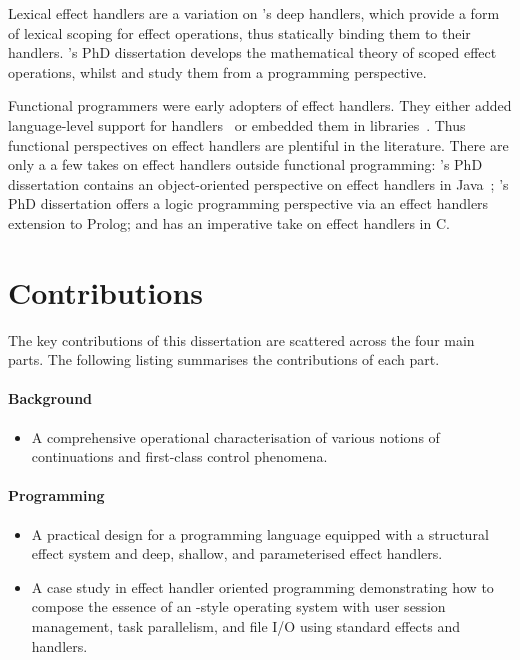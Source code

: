 \documentclass[12pt,phd,lfcs,twoside,openright,logo,leftchapter,normalheadings]{infthesis}
\theoremstyle{plain}
\theoremstyle{definition}
\begin{document}
Lexical effect handlers are a variation on \citeauthor{PlotkinP09}'s
deep handlers, which provide a form of lexical scoping for effect
operations, thus statically binding them to their handlers.
%
\citeauthor{Geron19}'s PhD dissertation develops the mathematical
theory of scoped effect operations, whilst \citet{WuSH14} and
\citet{BiernackiPPS20} study them from a programming perspective.

Functional programmers were early adopters of effect handlers. They
either added language-level support for handlers~
\cite{Hillerstrom15,DolanWSYM15,BiernackiPPS18,Leijen17,BauerP15,BrachthauserSO20a,LindleyMM17,Chiusano20}
or embedded them in
libraries~\cite{KiselyovSS13,KiselyovI15,KiselyovS16,KammarLO13,BrachthauserS17,Brady13,XieL20}. Thus
functional perspectives on effect handlers are plentiful in the
literature. There are only a a few takes on effect handlers outside
functional programming: \citeauthor{Brachthauser20}'s PhD dissertation
contains an object-oriented perspective on effect handlers in
Java~\cite{Brachthauser20}; \citeauthor{Saleh19}'s PhD dissertation
offers a logic programming perspective via an effect handlers
extension to Prolog; and \citet{Leijen17b} has an imperative take on
effect handlers in C.

\section{Contributions}
The key contributions of this dissertation are scattered across the
four main parts. The following listing summarises the contributions of
each part.
\paragraph{Background}
\begin{itemize}
  \item A comprehensive operational characterisation of various
    notions of continuations and first-class control phenomena.
\end{itemize}
\paragraph{Programming}
\begin{itemize}
  \item A practical design for a programming language equipped with a
    structural effect system and deep, shallow, and parameterised effect
    handlers.
  \item A case study in effect handler oriented programming
    demonstrating how to compose the essence of an \UNIX{}-style
    operating system with user session management, task parallelism,
    and file I/O using standard effects and handlers.
\end{itemize}
\end{document}
